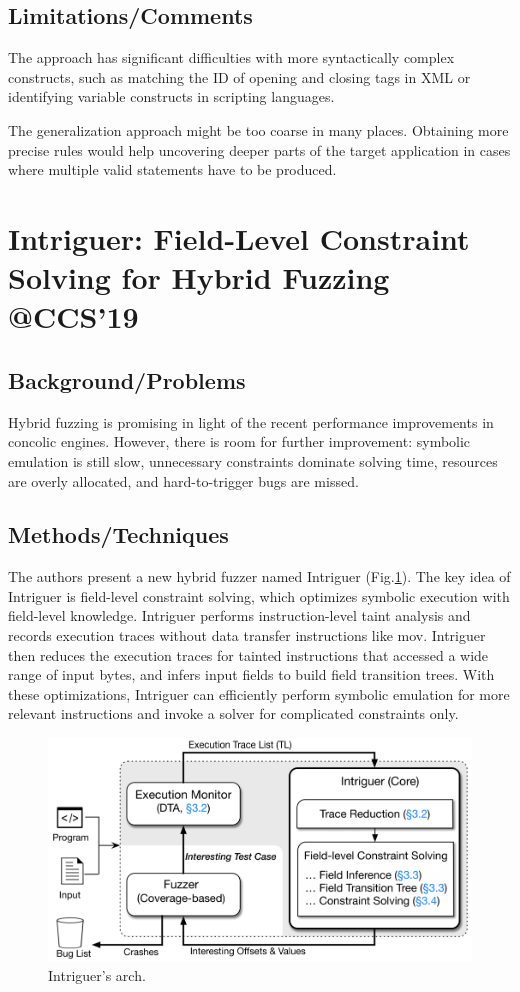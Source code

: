 \subsection{Limitations/Comments}
The approach has significant difficulties with more syntactically complex constructs, such as matching the ID of opening and closing tags in XML or identifying variable constructs in scripting languages. 

The generalization approach might be too coarse in many places. Obtaining more precise rules would help uncovering deeper parts of the target application in cases where multiple valid statements have to be produced. 
\newpage
\section{Intriguer: Field-Level Constraint Solving for Hybrid Fuzzing \\@CCS'19}
\subsection{Background/Problems}
Hybrid fuzzing is promising in light of the recent performance improvements in concolic engines. However, there is room for further improvement: symbolic emulation is still slow, unnecessary constraints dominate solving time, resources are overly allocated, and hard-to-trigger bugs are missed.

\subsection{Methods/Techniques}
The authors present a new hybrid fuzzer named Intriguer (Fig.\ref{fig:intriguer}). The key idea of Intriguer is field-level constraint solving, which optimizes symbolic execution with field-level knowledge. Intriguer performs instruction-level taint analysis and records execution traces without data transfer instructions like mov. Intriguer then reduces the execution traces for tainted instructions that accessed a wide range of input bytes, and infers input fields to build field transition trees. With these optimizations, Intriguer can efficiently perform symbolic emulation for more relevant instructions and invoke a solver for complicated constraints only.

\begin{figure}[h]
    \centering
    \includegraphics[width=0.9\linewidth]{intriguer.png} %
    \caption{Intriguer's arch.}	
    \label{fig:intriguer}
\end{figure}
